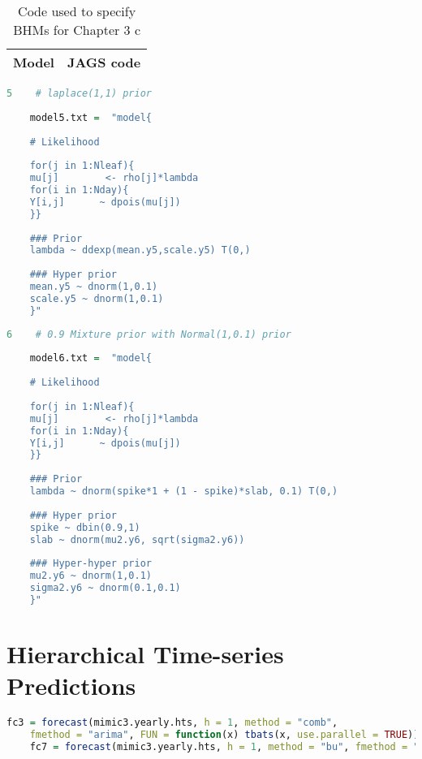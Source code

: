 \newpage
\begin{table}[!htb]
	\caption{Code used to specify BHMs for Chapter 3 c}
	
	\begin{tabularx}{\textwidth}{rX}
		\toprule
		Model & JAGS code\\
		\bottomrule
	\end{tabularx}
	
	\begin{lstlisting}[language=R, showstringspaces=false]
	5    # laplace(1,1) prior
	
	model5.txt =  "model{
	
	# Likelihood
	
	for(j in 1:Nleaf){
	mu[j]        <- rho[j]*lambda
	for(i in 1:Nday){
	Y[i,j]      ~ dpois(mu[j])
	}}
	
	### Prior
	lambda ~ ddexp(mean.y5,scale.y5) T(0,) 
	
	### Hyper prior
	mean.y5 ~ dnorm(1,0.1)
	scale.y5 ~ dnorm(1,0.1)
	}"
	\end{lstlisting}
	\intexthline
	\begin{lstlisting}[language=R, showstringspaces=false]
	6    # 0.9 Mixture prior with Normal(1,0.1) prior
	
	model6.txt =  "model{
	
	# Likelihood
	
	for(j in 1:Nleaf){
	mu[j]        <- rho[j]*lambda
	for(i in 1:Nday){
	Y[i,j]      ~ dpois(mu[j])
	}}
	
	### Prior
	lambda ~ dnorm(spike*1 + (1 - spike)*slab, 0.1) T(0,) 
	
	### Hyper prior
	spike ~ dbin(0.9,1)
	slab ~ dnorm(mu2.y6, sqrt(sigma2.y6)) 
	
	### Hyper-hyper prior
	mu2.y6 ~ dnorm(1,0.1)  
	sigma2.y6 ~ dnorm(0.1,0.1) 
	}"
	\end{lstlisting}
\end{table}

\newpage %

\section{Hierarchical Time-series Predictions}\label{htsp}
\begin{table}[!h]
	\caption{Example of R code used to make time-series prediction used in Chapter 3}
	
	\begin{lstlisting}[language=R, showstringspaces=false]
	fc3 = forecast(mimic3.yearly.hts, h = 1, method = "comb", 
	fmethod = "arima", FUN = function(x) tbats(x, use.parallel = TRUE)) 
	fc7 = forecast(mimic3.yearly.hts, h = 1, method = "bu", fmethod = "arima", FUN = function(x) tbats(x, use.parallel = TRUE)) 
	\end{lstlisting}
	
\end{table}

